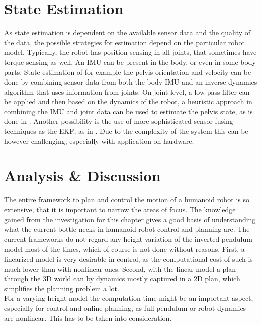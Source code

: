 \section{State Estimation} 
As state estimation is dependent on the available sensor data and the quality of the data, the possible strategies for estimation depend on the particular robot model. Typically, the robot has position sensing in all joints, that sometimes have torque sensing as well. An \ac{IMU} can be present in the body, or even in some body parts. State estimation of for example the pelvis orientation and velocity can be done by combining sensor data from both the body \ac{IMU} and an inverse dynamics algorithm that uses information from joints. On joint level, a low-pass filter can be applied and then based on the dynamics of the robot, a heuristic approach in combining the \ac{IMU} and joint data can be used to estimate the pelvis state, as is done in \cite{koolen2016design}. Another possibility is the use of more sophisticated sensor fusing techniques as the \ac{EKF}, as in \cite{kuindersma2016optimization}. Due to the complexity of the system this can be however challenging, especially with application on hardware. 

\section{Analysis \& Discussion}
The entire framework to plan and control the motion of a humanoid robot is so extensive, that it is important to narrow the areas of focus. The knowledge gained from the investigation for this chapter gives a good basis of understanding what the current bottle necks in humanoid robot control and planning are. The current frameworks do not regard any height variation of the inverted pendulum model most of the times, which of course is not done without reasons. First, a linearized model is very desirable in control, as the computational cost of such is much lower than with nonlinear ones. Second, with the linear model a plan through the \ac{3D} world can by dynamics mostly captured in a \ac{2D} plan, which simplifies the planning problem a lot. \\
For a varying height model the computation time might be an important aspect, especially for control and online planning, as full pendulum or robot dynamics are nonlinear. This has to be taken into consideration. 